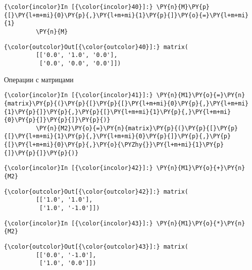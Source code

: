     \begin{Verbatim}[commandchars=\\\{\}]
{\color{incolor}In [{\color{incolor}40}]:} \PY{n}{M}\PY{p}{[}\PY{l+m+mi}{0}\PY{p}{,}\PY{l+m+mi}{1}\PY{p}{]}\PY{o}{=}\PY{l+m+mi}{1}
         \PY{n}{M}
\end{Verbatim}

            \begin{Verbatim}[commandchars=\\\{\}]
{\color{outcolor}Out[{\color{outcolor}40}]:} matrix(
         [['0.0', '1.0', '0.0'],
          ['0.0', '0.0', '0.0']])
\end{Verbatim}
        
    Операции с матрицами

    \begin{Verbatim}[commandchars=\\\{\}]
{\color{incolor}In [{\color{incolor}41}]:} \PY{n}{M1}\PY{o}{=}\PY{n}{matrix}\PY{p}{(}\PY{p}{[}\PY{p}{[}\PY{l+m+mi}{0}\PY{p}{,}\PY{l+m+mi}{1}\PY{p}{]}\PY{p}{,}\PY{p}{[}\PY{l+m+mi}{1}\PY{p}{,}\PY{l+m+mi}{0}\PY{p}{]}\PY{p}{]}\PY{p}{)}
         \PY{n}{M2}\PY{o}{=}\PY{n}{matrix}\PY{p}{(}\PY{p}{[}\PY{p}{[}\PY{l+m+mi}{1}\PY{p}{,}\PY{l+m+mi}{0}\PY{p}{]}\PY{p}{,}\PY{p}{[}\PY{l+m+mi}{0}\PY{p}{,}\PY{o}{\PYZhy{}}\PY{l+m+mi}{1}\PY{p}{]}\PY{p}{]}\PY{p}{)}
\end{Verbatim}

    \begin{Verbatim}[commandchars=\\\{\}]
{\color{incolor}In [{\color{incolor}42}]:} \PY{n}{M1}\PY{o}{+}\PY{n}{M2}
\end{Verbatim}

            \begin{Verbatim}[commandchars=\\\{\}]
{\color{outcolor}Out[{\color{outcolor}42}]:} matrix(
         [['1.0', '1.0'],
          ['1.0', '-1.0']])
\end{Verbatim}
        
    \begin{Verbatim}[commandchars=\\\{\}]
{\color{incolor}In [{\color{incolor}43}]:} \PY{n}{M1}\PY{o}{*}\PY{n}{M2}
\end{Verbatim}

            \begin{Verbatim}[commandchars=\\\{\}]
{\color{outcolor}Out[{\color{outcolor}43}]:} matrix(
         [['0.0', '-1.0'],
          ['1.0', '0.0']])
\end{Verbatim}
        
